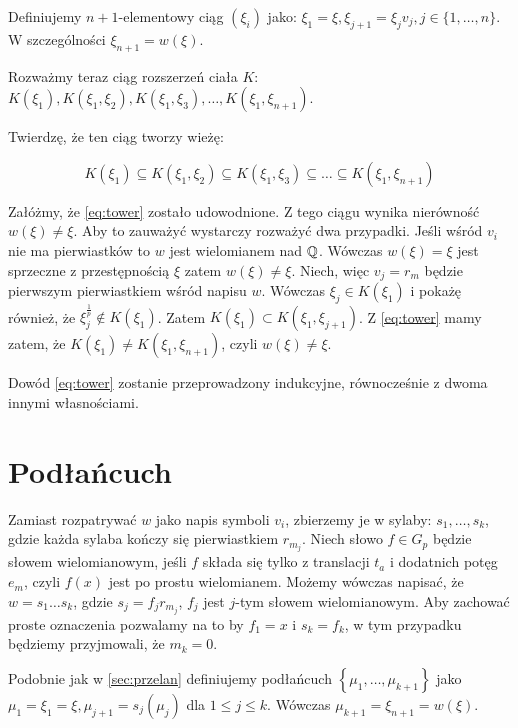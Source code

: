 Definiujemy $n+1$-elementowy ciąg $\left(\xi_i\right)$ jako: $\xi_1 = \xi,
\xi_{j+1} = \xi_{j}v_j, j \in \{1, \ldots, n\}$. W szczególności $\xi_{n+1} =
w(\xi)$.

Rozważmy teraz ciąg rozszerzeń ciała $K$:
$
K\left(\xi_1\right),
K\left(\xi_1, \xi_2\right),
K\left(\xi_1, \xi_3\right),
\ldots,
K\left(\xi_1, \xi_{n+1}\right)$.

Twierdzę, że ten ciąg tworzy wieżę:

\begin{equation}
K\left(\xi_1\right) \subseteq
K\left(\xi_1, \xi_2\right) \subseteq
K\left(\xi_1, \xi_3\right) \subseteq 
\ldots
\subseteq
K\left(\xi_1, \xi_{n+1}\right)
\label{eq:tower}
\end{equation}

Załóżmy, że \ref{eq:tower} zostało udowodnione. Z tego ciągu wynika nierówność
$w\left(\xi\right) \neq \xi$. Aby to zauważyć wystarczy rozważyć dwa przypadki.
Jeśli wśród $v_i$ nie ma pierwiastków to $w$ jest wielomianem nad $\mathbb{Q}$. Wówczas
$w(\xi) = \xi$ jest sprzeczne z przestępnością $\xi$ zatem $w(\xi) \neq \xi$.
Niech, więc $v_j = r_m$ będzie pierwszym pierwiastkiem wśród napisu $w$. Wówczas
$\xi_j \in K\left(\xi_1\right)$ i pokażę również, że $\xi_{j}^{\frac{1}{p}} \not
\in K(\xi_1)$. Zatem $K\left(\xi_1\right) \subset K\left(\xi_1,
\xi_{j+1}\right)$. Z \ref{eq:tower} mamy zatem, że $K\left(\xi_1\right) \neq
  K\left(\xi_1, \xi_{n+1}\right)$, czyli $w(\xi) \neq \xi$.

Dowód \ref{eq:tower} zostanie przeprowadzony indukcyjne, równocześnie z dwoma
innymi własnościami.

\section{Podłańcuch}

Zamiast rozpatrywać $w$ jako napis symboli $v_i$, zbierzemy je w sylaby: $s_1,
\ldots, s_k$, gdzie każda sylaba kończy się pierwiastkiem $r_{m_j}$. Niech słowo
$f \in G_p$ będzie słowem wielomianowym, jeśli $f$ składa się tylko z
translacji $t_a$ i dodatnich potęg $e_m$, czyli $f(x)$ jest po prostu
wielomianem. Możemy wówczas napisać, że $w = s_1\ldots s_k$, gdzie $s_j =
f_jr_{m_j}$, $f_j$ jest $j$-tym słowem wielomianowym. Aby zachować proste
oznaczenia pozwalamy na to by $f_1 = x$  i $s_k = f_k$, w tym przypadku będziemy
przyjmowali, że $m_k = 0$. 

Podobnie jak w 
\ref{sec:przelan} definiujemy podłańcuch $\left\{\mu_1, \ldots,
\mu_{k+1}\right\}$ jako $\mu_1 = \xi_1 = \xi, \mu_{j+1} = s_j\left(\mu_j\right)$
dla $1 \leq j \leq k$. Wówczas $\mu_{k+1} = \xi_{n+1} = w(\xi)$.

